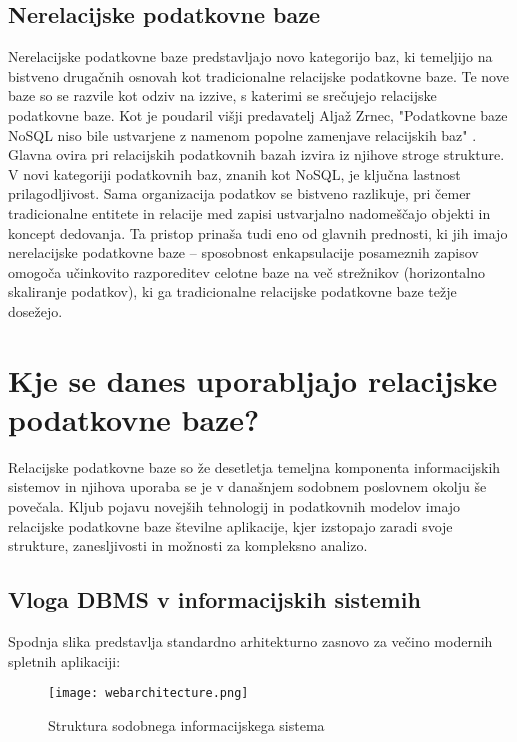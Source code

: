 \documentclass[a4paper,12pt,openright]{book}
\begin{document}
        \subsection{Nerelacijske podatkovne baze}
        Nerelacijske podatkovne baze predstavljajo novo kategorijo baz, ki temeljijo na bistveno drugačnih osnovah kot tradicionalne relacijske podatkovne baze. Te nove baze so se razvile kot odziv na izzive, s katerimi se srečujejo relacijske podatkovne baze. Kot je poudaril višji predavatelj Aljaž Zrnec, "Podatkovne baze NoSQL niso bile ustvarjene z namenom popolne zamenjave relacijskih baz" \cite{zrnec2011podatkovne}. Glavna ovira pri relacijskih podatkovnih bazah izvira iz njihove stroge strukture. V novi kategoriji podatkovnih baz, znanih kot NoSQL, je ključna lastnost prilagodljivost. Sama organizacija podatkov se bistveno razlikuje, pri čemer tradicionalne entitete in relacije med zapisi ustvarjalno nadomeščajo objekti in koncept dedovanja. Ta pristop prinaša tudi eno od glavnih prednosti, ki jih imajo nerelacijske podatkovne baze – sposobnost enkapsulacije posameznih zapisov omogoča učinkovito razporeditev celotne baze na več strežnikov (horizontalno skaliranje podatkov), ki ga tradicionalne relacijske podatkovne baze težje dosežejo.
    
    \section{Kje se danes uporabljajo relacijske podatkovne baze?}

    Relacijske podatkovne baze so že desetletja temeljna komponenta informacijskih sistemov in njihova uporaba se je v današnjem sodobnem poslovnem okolju še povečala. Kljub pojavu novejših tehnologij in podatkovnih modelov imajo relacijske podatkovne baze številne aplikacije, kjer izstopajo zaradi svoje strukture, zanesljivosti in možnosti za kompleksno analizo.

    \newpage
    \subsection{Vloga DBMS v informacijskih sistemih}

    Spodnja slika predstavlja standardno arhitekturno zasnovo za večino modernih spletnih aplikaciji:
    \begin{figure}[h]
        \centerline{\texttt{[image: webarchitecture.png]}}
        \caption{Struktura sodobnega informacijskega sistema}
        \label{infsistem}
    \end{figure}
\end{document}
